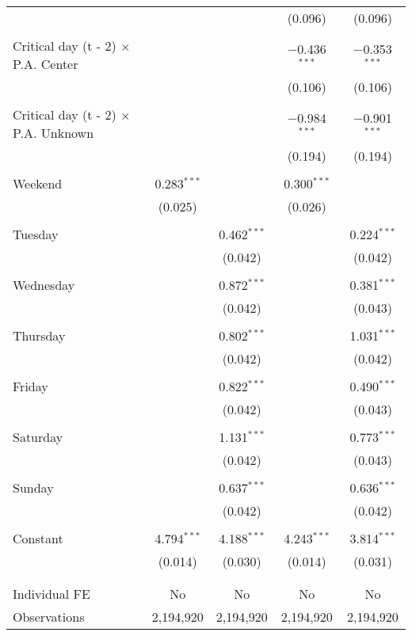 \documentclass[
]{article}
\begin{document}
\begin{table}[!htbp]
{\begin{tabular}{@{\extracolsep{5pt}}lcccc}
  &  &  & (0.096) & (0.096) \\ 
  & & & & \\ 
 Critical day (t - 2) $\times$ P.A. Center &  &  & $-$0.436$^{***}$ & $-$0.353$^{***}$ \\ 
  &  &  & (0.106) & (0.106) \\ 
  & & & & \\ 
 Critical day (t - 2) $\times$ P.A. Unknown &  &  & $-$0.984$^{***}$ & $-$0.901$^{***}$ \\ 
  &  &  & (0.194) & (0.194) \\ 
  & & & & \\ 
 Weekend & 0.283$^{***}$ &  & 0.300$^{***}$ &  \\ 
  & (0.025) &  & (0.026) &  \\ 
  & & & & \\ 
 Tuesday &  & 0.462$^{***}$ &  & 0.224$^{***}$ \\ 
  &  & (0.042) &  & (0.042) \\ 
  & & & & \\ 
 Wednesday &  & 0.872$^{***}$ &  & 0.381$^{***}$ \\ 
  &  & (0.042) &  & (0.043) \\ 
  & & & & \\ 
 Thursday &  & 0.802$^{***}$ &  & 1.031$^{***}$ \\ 
  &  & (0.042) &  & (0.042) \\ 
  & & & & \\ 
 Friday &  & 0.822$^{***}$ &  & 0.490$^{***}$ \\ 
  &  & (0.042) &  & (0.043) \\ 
  & & & & \\ 
 Saturday &  & 1.131$^{***}$ &  & 0.773$^{***}$ \\ 
  &  & (0.042) &  & (0.043) \\ 
  & & & & \\ 
 Sunday &  & 0.637$^{***}$ &  & 0.636$^{***}$ \\ 
  &  & (0.042) &  & (0.042) \\ 
  & & & & \\ 
 Constant & 4.794$^{***}$ & 4.188$^{***}$ & 4.243$^{***}$ & 3.814$^{***}$ \\ 
  & (0.014) & (0.030) & (0.014) & (0.031) \\ 
  & & & & \\ 
\hline \\[-1.8ex] 
Individual FE & No & No & No & No \\ 
Observations & 2,194,920 & 2,194,920 & 2,194,920 & 2,194,920 \\ 

\end{tabular}}
\end{table}
\end{document}
